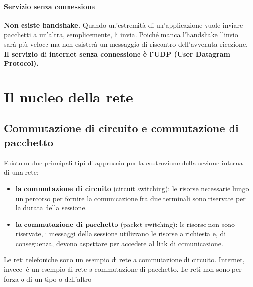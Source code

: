 \documentclass[11pt,a4paper]{book}
\begin{document}
\paragraph{Servizio senza connessione}
\textbf{Non esiste handshake.} Quando un’estremità di un’applicazione vuole inviare pacchetti a un’altra, semplicemente, li invia. Poiché manca l’handshake l’invio sarà più veloce ma non esisterà un messaggio di riscontro dell’avvenuta ricezione.
\textbf{Il servizio di internet senza connessione è l’UDP (User Datagram Protocol).}

\section{Il nucleo della rete}
\subsection{Commutazione di circuito e commutazione di pacchetto}
Esistono due principali tipi di approccio per la costruzione della sezione interna di una rete:
\begin{itemize}
	\item l\textbf{a commutazione di circuito} (circuit switching): le risorse necessarie lungo un percorso per fornire la comunicazione fra due terminali sono riservate per la durata della sessione.
	\item \textbf{la commutazione di pacchetto} (packet switching): le risorse non sono riservate, i messaggi della sessione utilizzano le risorse a richiesta e, di conseguenza, devono aspettare per accedere al link di comunicazione.
\end{itemize}
Le reti telefoniche sono un esempio di rete a commutazione di circuito. Internet, invece, è un esempio di rete a commutazione di pacchetto. Le reti non sono per forza o di un tipo o dell’altro.
\end{document}

